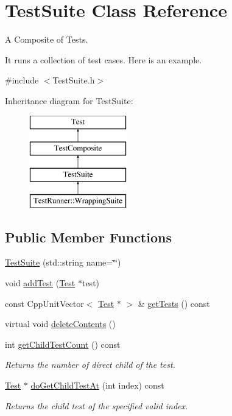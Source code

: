 \hypertarget{class_test_suite}{\section{Test\-Suite Class Reference}
\label{class_test_suite}
}


A Composite of Tests.

It runs a collection of test cases. Here is an example.  




{\ttfamily \#include $<$Test\-Suite.\-h$>$}

Inheritance diagram for Test\-Suite\-:\begin{figure}[H]
\begin{center}
\leavevmode
\includegraphics[height=4.000000cm]{class_test_suite}
\end{center}
\end{figure}
\subsection*{Public Member Functions}
\begin{DoxyCompactItemize}
\item 
\hyperlink{class_test_suite_aedef358022b725810f2f145ac078c01b}{Test\-Suite} (std\-::string name=\char`\"{}\char`\"{})
\item 
void \hyperlink{class_test_suite_a8cd9628eee382a9670076765ec25cfa8}{add\-Test} (\hyperlink{class_test}{Test} $\ast$test)
\item 
const Cpp\-Unit\-Vector$<$ \hyperlink{class_test}{Test} $\ast$ $>$ \& \hyperlink{class_test_suite_ad2bd3e20523bb357b7a4608a7978ea49}{get\-Tests} () const 
\item 
virtual void \hyperlink{class_test_suite_ac968917f934d102227abd8b2130e67f9}{delete\-Contents} ()
\item 
\hypertarget{class_test_suite_aeaabfd3afef12412cd390b90128a7d87}{int \hyperlink{class_test_suite_aeaabfd3afef12412cd390b90128a7d87}{get\-Child\-Test\-Count} () const }\label{class_test_suite_aeaabfd3afef12412cd390b90128a7d87}

\begin{DoxyCompactList}\small\item\em Returns the number of direct child of the test. \end{DoxyCompactList}\item 
\hyperlink{class_test}{Test} $\ast$ \hyperlink{class_test_suite_aab4d1f64d7b32a24489cc2a3f3e412ee}{do\-Get\-Child\-Test\-At} (int index) const 
\begin{DoxyCompactList}\small\item\em Returns the child test of the specified valid index. \end{DoxyCompactList}\end{DoxyCompactItemize}
